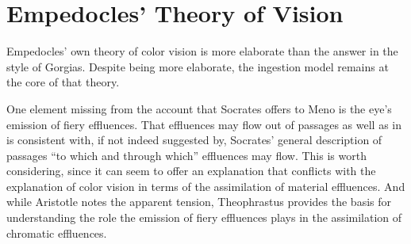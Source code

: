 
\section{Empedocles' Theory of Vision} %
\label{sec:empedocles_theory_of_vision}

Empedocles' own theory of color vision is more elaborate than the answer in the style of Gorgias. Despite being more elaborate, the ingestion model remains at the core of that theory. 

One element missing from the account that Socrates offers to Meno is the eye's emission of fiery effluences. That effluences may flow out of passages as well as in is consistent with, if not indeed suggested by, Socrates' general description of passages ``to which and through which'' effluences may flow. This is worth considering, since it can seem to offer an explanation that conflicts with the explanation of color vision in terms of the assimilation of material effluences. And while Aristotle notes the apparent tension, Theophrastus provides the basis for understanding the role the emission of fiery effluences plays in the assimilation of chromatic effluences.

